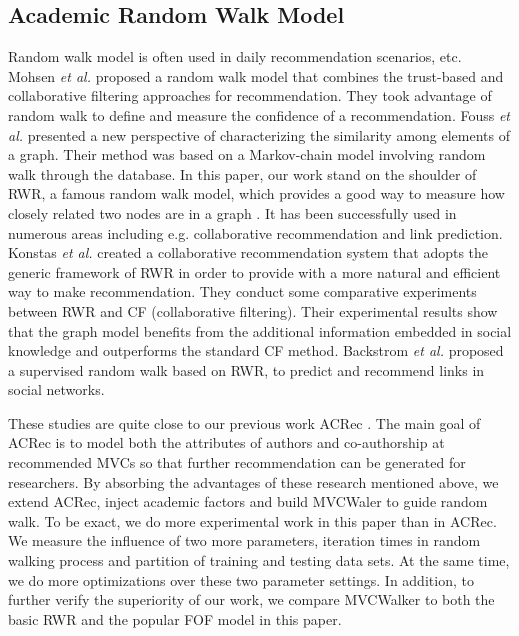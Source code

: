 \documentclass[10pt,journal,compsoc]{IEEEtran}
\begin{document}
\subsection{Academic Random Walk Model}
Random walk model is often used in daily recommendation scenarios, etc. Mohsen \textit{et al.} \cite{Jamali:trustwalker} proposed a random walk model that combines the trust-based and collaborative filtering approaches for recommendation. They took advantage of random walk to define and measure the confidence of a recommendation. Fouss \textit{et al.} \cite{Fouss:RW} presented a new perspective of characterizing the similarity among elements of a graph. Their method was based on a Markov-chain model involving random walk through the database. In this paper, our work stand on the shoulder of RWR, a famous random walk model, which provides a good way to measure how closely related two nodes are in a graph \cite{Tong:RWR}. It has been successfully used in numerous areas including e.g. collaborative recommendation and link prediction. Konstas \textit{et al.} \cite{konstas2009social} created a collaborative recommendation system that adopts the generic framework of RWR in order to provide with a more natural and efficient way to make recommendation. They conduct some comparative experiments between RWR and CF (collaborative filtering). Their experimental results show that the graph model benefits from the additional information embedded in social knowledge and outperforms the standard CF method. Backstrom \textit{et al.} \cite{Backstrom:Supervised} proposed a supervised random walk based on RWR, to predict and recommend links in social networks.

These studies are quite close to our previous work ACRec \cite{Jing:ACRec}. The main goal of ACRec is to model both the attributes of authors and co-authorship at recommended MVCs so that further recommendation can be generated for researchers. By absorbing the advantages of these research mentioned above, we extend ACRec, inject academic factors and build MVCWaler to guide random walk. To be exact, we do more experimental work in this paper than in ACRec. We measure the influence of two more parameters, iteration times in random walking process and partition of training and testing data sets. At the same time, we do more optimizations over these two parameter settings. In addition, to further verify the superiority of our work, we compare MVCWalker to both the basic RWR and the popular FOF model in this paper.
\end{document}
